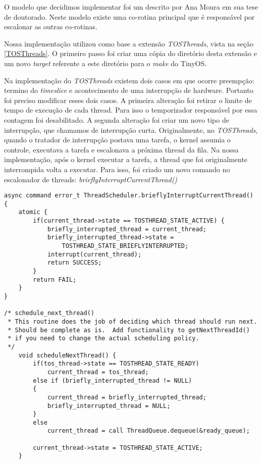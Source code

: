 O modelo que decidimos implementar foi um descrito por Ana Moura em sua tese de doutorado\cite[s. 6.2]{Moura/04}.
Neste modelo existe uma co-rotina principal que é responsável por escalonar as outras co-rotinas.

Nossa implementação utilizou como base a extensão \textit{TOSThreads}, vista na seção \ref{TOSThreads}. O primeiro passo
foi criar uma cópia do diretório desta extensão e um novo \textit{target} referente a este diretório para o \textit{make} do TinyOS.

Na implementação do \textit{TOSThreads} existem dois casos em que ocorre preempção: termino do \textit{timeslice} e
acontecimento de uma interrupção de hardware. Portanto foi preciso modificar esses dois casos.
A primeira alteração foi retirar o limite de tempo de execução de cada thread. Para isso o temporizador responsável por
essa contagem foi desabilitado.
A segunda alteração foi criar um novo tipo de interrupção, que chamamos de interrupção curta. Originalmente, no
\textit{TOSThreads}, quando o tratador de interrupção postava uma tarefa, o kernel assumia o controle, executava a
tarefa e escalonava a próxima thread da fila. Na nossa implementação, após o kernel executar a tarefa, a thread que foi
originalmente interrompida volta a executar. Para isso, foi criado um novo comando no escalonador de threads:
\textit{brieflyInterruptCurrentThread()}
\begin{lstlisting}
async command error_t ThreadScheduler.brieflyInterruptCurrentThread() {
    atomic {
        if(current_thread->state == TOSTHREAD_STATE_ACTIVE) {
            briefly_interrupted_thread = current_thread;
            briefly_interrupted_thread->state =
                TOSTHREAD_STATE_BRIEFLYINTERRUPTED;
            interrupt(current_thread);
            return SUCCESS;
        }
        return FAIL;
    }
}

/* schedule_next_thread()
 * This routine does the job of deciding which thread should run next.
 * Should be complete as is.  Add functionality to getNextThreadId() 
 * if you need to change the actual scheduling policy.
 */
    void scheduleNextThread() {
        if(tos_thread->state == TOSTHREAD_STATE_READY)
            current_thread = tos_thread;
        else if (briefly_interrupted_thread != NULL)
        {
            current_thread = briefly_interrupted_thread;
            briefly_interrupted_thread = NULL;
        }
        else
            current_thread = call ThreadQueue.dequeue(&ready_queue);

        current_thread->state = TOSTHREAD_STATE_ACTIVE;
    }

\end{lstlisting}

